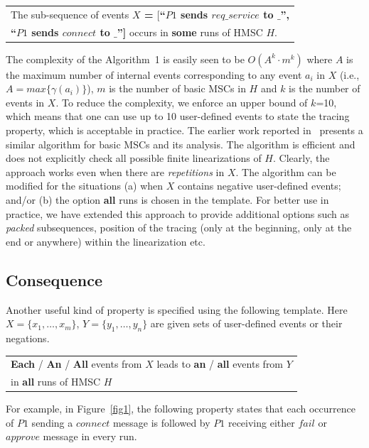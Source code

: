 \documentclass{entcs}
\begin{document}
\begin{tabular}{|l|}
\hline
The sub-sequence of events {\bf $X$ = $[$``$P1$ sends $req\_service$ to $\_$'',}\\
{\bf ``$P1$ sends $connect$ to $\_$'']} occurs in {\bf some} runs of HMSC {\bf $H$}.\\
\hline
\end{tabular}

The complexity of the Algorithm~1 is easily seen to be 
$O(A^k \cdot m^k)$ where $A$ is the maximum number of 
internal events corresponding to any event $a_i$ in $X$ 
(i.e., $A = max \{\gamma(a_i)\}$), $m$ is the number of 
basic MSCs in $H$ and $k$ is the number of events in $X$. 
To reduce the complexity, we enforce an upper bound of 
$k$=10, which means that one can use up to 10 user-defined 
events to state the tracing property, which is acceptable 
in practice. The earlier work reported in~\cite{BVP02} presents 
a similar algorithm for basic MSCs and its analysis. 
The algorithm is efficient and does not 
explicitly check all possible finite linearizations of $H$. 
Clearly, the approach works even when there are 
{\em {repetitions}} in $X$. The algorithm can be modified 
for the situations (a) when $X$ contains negative user-defined 
events; and/or (b) the option {\bf {all}} runs is chosen 
in the template. For better use in practice, we have 
extended this approach to provide additional options 
such as {\em packed} subsequences, position of the tracing 
(only at the beginning, only at the end or anywhere) 
within the linearization etc.

\subsection{Consequence}\label{conseq}

Another useful kind of property is specified using 
the following template. Here $X = \{x_1,\ldots,x_m\}$, 
$Y = \{y_1,\ldots,y_n\}$ are given sets of user-defined 
events or their negations. 

\begin{tabular}{|l|}
\hline
{\bf Each} / {\bf An} / {\bf All} events from {\bf $X$} 
leads to {\bf an} / {\bf all} events from {\bf $Y$} \\
in {\bf all} runs of HMSC {\bf $H$} \\
\hline
\end{tabular}

For example, in Figure~\ref{fig1}, the following property states 
that each occurrence of $P1$ sending a $connect$ message 
is followed by $P1$ receiving either $fail$ or $approve$ 
message in every run. 
\end{document}
